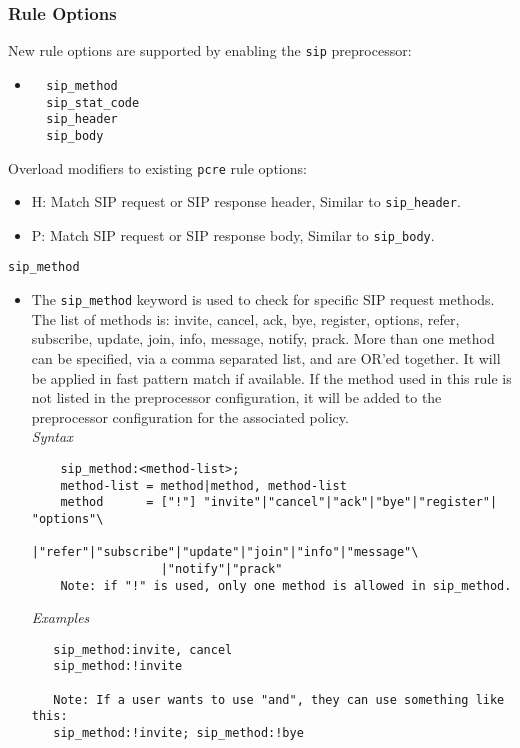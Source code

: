 \documentclass[english]{report}
\begin{document}
\subsubsection{Rule Options}
New rule options are supported by enabling the \texttt{sip} preprocessor:
\begin{itemize}
\item[]
\begin{verbatim}
  sip_method
  sip_stat_code
  sip_header
  sip_body
\end{verbatim}
\end{itemize}
Overload modifiers to existing \texttt{pcre} rule options:
\begin{itemize}
\item[] H: Match SIP request or SIP response header, Similar to \texttt{sip\_header}.
\item[] P: Match SIP request or SIP response body, Similar to \texttt{sip\_body}.
\end{itemize}
\texttt{sip\_method}
\label{sip:sip_method}
\begin{itemize}
 \item[] The  \texttt{sip\_method} keyword is used to check for specific SIP request methods.  
  The list of methods is: invite, cancel, ack, bye, register, options, refer, 
  subscribe, update, join, info, message, notify, prack.  More than one method 
  can be specified, via a comma separated list, and are OR'ed together.  
  It will be applied in fast pattern match if available. If the method used in 
  this rule is not listed in the preprocessor configuration, it will be added
  to the preprocessor configuration for the associated policy.\\

\textit{Syntax}
\footnotesize
\begin{verbatim}
    sip_method:<method-list>;
    method-list = method|method, method-list
    method      = ["!"] "invite"|"cancel"|"ack"|"bye"|"register"| "options"\
                  |"refer"|"subscribe"|"update"|"join"|"info"|"message"\                
                  |"notify"|"prack"
    Note: if "!" is used, only one method is allowed in sip_method. 
\end{verbatim}
\normalsize
\textit{Examples}
\footnotesize
\begin{verbatim}
   sip_method:invite, cancel
   sip_method:!invite
   
   Note: If a user wants to use "and", they can use something like this:
   sip_method:!invite; sip_method:!bye
\end{verbatim}
\normalsize
\end{itemize}
\end{document}
